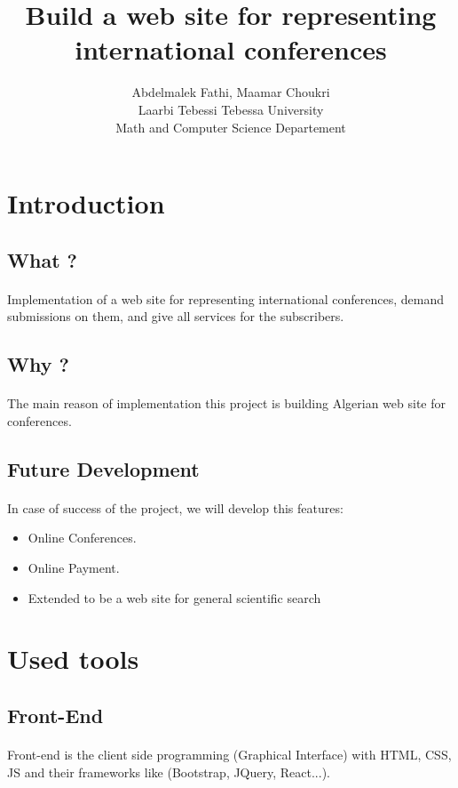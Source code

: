 \documentclass{article}
\title{Build a web site for representing international conferences}
\author{Abdelmalek Fathi, Maamar Choukri\\
Laarbi Tebessi Tebessa University\\
Math and Computer Science Departement}
\date{}
\begin{document}
	\maketitle
	\section{Introduction}
	\subsection{What ?}
	\paragraph{}
	Implementation of a web site for representing international conferences, demand submissions on them, and give all services for the subscribers.
	\subsection{Why ?}
	\paragraph{}
	The main reason of implementation this project is building Algerian web site for conferences.
	\subsection{Future Development}
	\paragraph{}
	In case of success of the project, we will develop this features:
	\begin{itemize}
		\item Online Conferences.
		\item Online Payment.
		\item Extended to be a web site for general scientific search
	\end{itemize}
	\newpage
	\section{Used tools}
	\subsection{Front-End}
	\paragraph{}
	Front-end is the client side programming (Graphical Interface) with HTML, CSS, JS and their frameworks like (Bootstrap, JQuery, React...).
\end{document}

